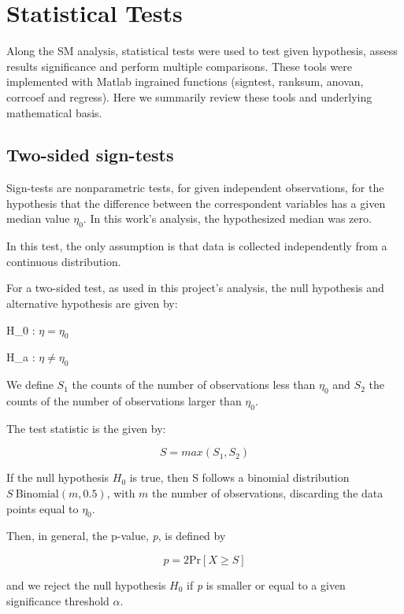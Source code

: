 \section{Statistical Tests}
\label{sec:StatisticalTests}

Along the SM analysis, statistical tests were used to test given hypothesis, assess results significance and perform multiple comparisons. These tools were implemented with Matlab ingrained functions (signtest, ranksum, anovan, corrcoef and regress). Here we summarily review these tools and underlying mathematical basis.

\subsection{Two-sided sign-tests}
\label{subsec:signtests}

Sign-tests are nonparametric tests, for given independent observations, for the hypothesis that the difference between the correspondent variables has a given median value $\eta_0$. In this work's analysis, the hypothesized median was zero. 

In this test, the only assumption is that data is collected independently from a continuous distribution.

For a two-sided test, as used in this project's analysis, the null hypothesis and alternative hypothesis are given by:

H_0 : $\eta = \eta _0$

H_a : $\eta \neq \eta _0$

We define $S_1$ the counts of the number of observations less than $\eta _0$ and  $S_2$ the counts of the number of observations larger than $\eta _0$. 

The test statistic is the given by:

\begin{equation}
S=max(S_1, S_2)
\end{equation}

If the null hypothesis $H_0$ is true, then S follows a binomial distribution $S ~ \text{Binomial} (m, 0.5)$, with $m$ the number of observations, discarding the data points equal to $\eta _0$.

Then, in general, the p-value, \textit{p}, is defined by

\begin{equation}
p=2 \text{Pr}\left[ X \geq S \right]
\end{equation}

and we reject the null hypothesis $H_0$ if \textit{p} is smaller or equal to a given significance threshold $\alpha$.

